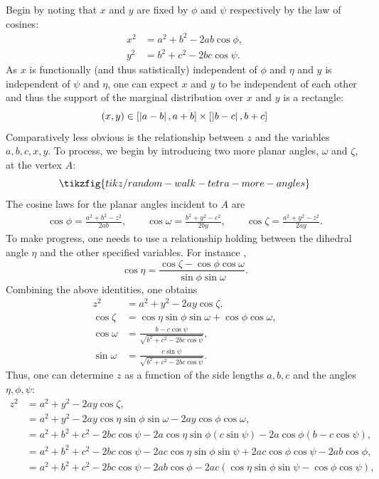 \documentclass[notitlepage]{article}
\begin{document}
Begin by noting that $x$ and $y$ are fixed by $\phi$ and $\psi$ respectively by the law of cosines:
\begin{align}
    x^2 &= a^2 + b^2 - 2ab \cos \phi, \\
    y^2 &= b^2 + c^2 - 2bc \cos \psi.
\end{align}
As $x$ is functionally (and thus satistically) independent of $\phi$ and $\eta$ and $y$ is independent of $\psi$ and $\eta$, one can expect $x$ and $y$ to be independent of each other and thus the support of the marginal distribution over $x$ and $y$ is a rectangle:
\begin{equation}
    (x,y) \in [\left|a-b\right|, a+b] \times [\left|b-c\right|, b+c]
\end{equation}
Comparatively less obvious is the relationship between $z$ and the variables $a,b,c,x,y$.
To process, we begin by introducing two more planar angles, $\omega$ and $\zeta$, at the vertex $A$:
\begin{equation}
    \tikzfig{tikz/random-walk-tetra-more-angles}
\end{equation}
The cosine laws for the planar angles incident to $A$ are
\begin{align}
    \cos \phi = \frac{a^2 + b^2 - z^2}{2ab}, \qquad
    \cos \omega = \frac{b^2 + y^2 - c^2}{2by}, \qquad
    \cos \zeta = \frac{a^2 + y^2 - z^2}{2ay}.
\end{align}
To make progress, one needs to use a relationship holding between the dihedral angle $\eta$ and the other specified variables.
For instance \cite{richardson1902trigonometry},
\begin{equation}
    \cos \eta = \frac{\cos\zeta - \cos\phi \cos \omega}{\sin \phi \sin \omega}.
\end{equation}
Combining the above identities, one obtains
\begin{align}
    z^2 &= a^2 + y^2 - 2 a y\cos \zeta, \\
    \cos \zeta &= \cos \eta \sin \phi \sin \omega + \cos \phi \cos \omega, \\
    \cos \omega &= \frac{b - c \cos \psi}{\sqrt{b^2 + c^2 - 2bc \cos \psi}}, \\
    \sin \omega &= \frac{c \sin\psi}{\sqrt{b^2 + c^2 - 2bc \cos \psi}}.
\end{align}
Thus, one can determine $z$ as a function of the side lengths $a,b,c$ and the angles $\eta,\phi,\psi$:
\begin{align}
    z^2 
    &= a^2 + y^2 - 2 a y\cos \zeta, \\
    &= a^2 + y^2 - 2 a y\cos \eta \sin \phi \sin \omega - 2 a y \cos \phi \cos \omega, \\
    &= a^2 + b^2 + c^2 - 2bc \cos \psi - 2 a\cos \eta \sin \phi (c \sin \psi) - 2 a \cos \phi (b-c\cos\psi), \\
    &= a^2 + b^2 + c^2 - 2bc \cos \psi - 2 ac\cos \eta \sin \phi \sin \psi + 2 a c \cos \phi \cos\psi- 2 ab \cos \phi, \\
    &= a^2 + b^2 + c^2 - 2bc \cos \psi - 2 ab \cos \phi - 2 ac(\cos \eta \sin \phi \sin \psi -\cos \phi \cos\psi),
\end{align}
\end{document}
